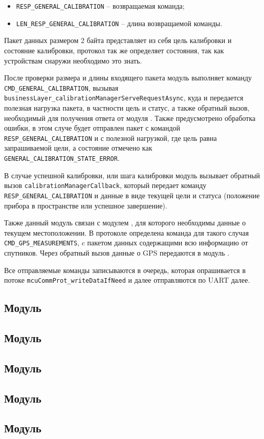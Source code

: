 \begin{itemize}
    \item \lstinline{RESP_GENERAL_CALIBRATION} -- возвращаемая команда;
    \item \lstinline{LEN_RESP_GENERAL_CALIBRATION} -- длина возвращаемой команды.
\end{itemize}

Пакет данных размером 2 байта представляет из себя цель калибровки и состояние калибровки, протокол так же определяет состояния, так как устройствам снаружи необходимо это знать.

После проверки размера и длины входящего пакета модуль выполняет команду \lstinline{CMD_GENERAL_CALIBRATION}, вызывая \lstinline{businessLayer_calibrationManagerServeRequestAsync},
куда и передается полезная нагрузка пакета, в частности цель и статус, а также обратный вызов, необходимый для получения ответа от модуля \moduleCalibControl.
Также предусмотрено обработка ошибки, в этом случе будет отправлен пакет с командой
\lstinline{RESP_GENERAL_CALIBRATION} и с полезной нагрузкой, где цель равна запрашиваемой цели, а состояние отмечено как \lstinline{GENERAL_CALIBRATION_STATE_ERROR}.

В случае успешной калибровки, или шага калибровки модуль \moduleCalibControl вызывает обратный вызов \lstinline{calibrationManagerCallback}, который передает команду 
\lstinline{RESP_GENERAL_CALIBRATION} и данные в виде текущей цели и статуса (положение прибора в пространстве или успешное завершение).

Также данный модуль связан с модулем \moduleOrientationAzimuth , для которого необходимы данные о текущем местоположении. В протоколе определена команда для такого случая
\lstinline{CMD_GPS_MEASUREMENTS}, c пакетом данных содержащими всю информацию от спутников. Через обратный вызов данные о GPS передаются в модуль \moduleOrientationAzimuth .

Все отправляемые команды записываются в очередь, которая опрашивается в потоке \lstinline{mcuCommProt_writeDataIfNeed} и далее отправляются по UART далее.

\subsection{Модуль \moduleMoveDetect}

\subsection{Модуль \moduleOrientationAzimuth}

\subsection{Модуль \moduleFindTarget}

\subsection{Модуль \moduleFlashMemory}

\subsection{Модуль \moduleGraphics}
